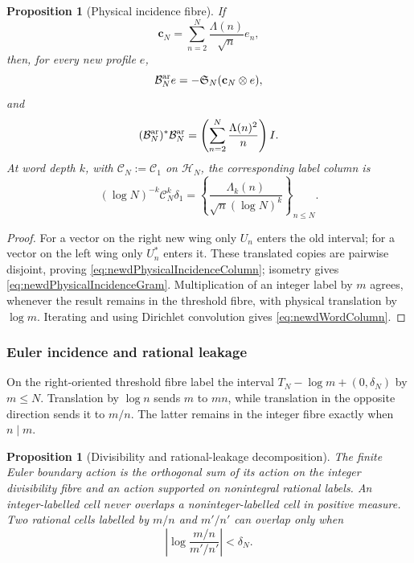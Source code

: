 \documentclass[11pt]{amsart}
\newtheorem{proposition}[theorem]{Proposition}
\theoremstyle{definition}
\theoremstyle{remark}
\begin{document}
\begin{proposition}[Physical incidence fibre]
\label{prop:newdPhysicalIncidence}
If
\[
 \mathbf c_N=\sum_{n=2}^N\frac{\Lambda(n)}{\sqrt n}e_n,
\]
then, for every new profile $e$,
\begin{equation}\label{eq:newdPhysicalIncidenceColumn}
 \mathcal B_N^{\rm ar}e=-\mathfrak S_N(\mathbf c_N\otimes e),
\end{equation}
and
\begin{equation}\label{eq:newdPhysicalIncidenceGram}
 (\mathcal B_N^{\rm ar})^*\mathcal B_N^{\rm ar}
 =\left(\sum_{n=2}^N\frac{\Lambda(n)^2}{n}\right)I.
\end{equation}
At word depth $k$, with $\mathscr C_N:=\mathscr C_1$ on $\mathcal H_N$, the
corresponding label column is
\begin{equation}\label{eq:newdWordColumn}
 (\log N)^{-k}\mathscr C_N^k\delta_1
 =\left\{\frac{\Lambda_k(n)}
                {\sqrt n(\log N)^k}\right\}_{n\leq N}.
\end{equation}
\end{proposition}

\begin{proof}
For a vector on the right new wing only $U_n$ enters the old interval;
for a vector on the left wing only $U_n^*$ enters it.  These translated
copies are pairwise disjoint, proving
\eqref{eq:newdPhysicalIncidenceColumn}; isometry gives
\eqref{eq:newdPhysicalIncidenceGram}.  Multiplication of an integer label by
$m$ agrees, whenever the result remains in the threshold fibre, with
physical translation by $\log m$.  Iterating and using Dirichlet convolution
gives \eqref{eq:newdWordColumn}.
\end{proof}

\subsubsection{Euler incidence and rational leakage}

On the right-oriented threshold fibre label the interval
$T_N-\log m+(0,\delta_N)$ by $m\leq N$.  Translation by $\log n$ sends
$m$ to $mn$, while translation in the opposite direction sends it to
$m/n$.  The latter remains in the integer fibre exactly when $n\mid m$.

\begin{proposition}[Divisibility and rational-leakage decomposition]
\label{prop:newdLeakageSplit}
The finite Euler boundary action is the orthogonal sum of its action on the
integer divisibility fibre and an action supported on nonintegral rational
labels.  An integer-labelled cell never overlaps a noninteger-labelled cell
in positive measure.  Two rational cells labelled by $m/n$ and $m'/n'$ can
overlap only when
\begin{equation}\label{eq:newdOverlapCondition}
 \left|\log\frac{m/n}{m'/n'}\right|<\delta_N.
\end{equation}
\end{proposition}
\end{document}
